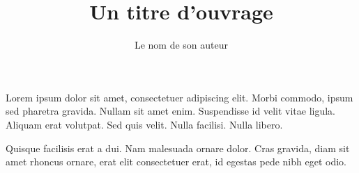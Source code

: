 \documentclass[12pt]{book}
\begin{document}
\title{Un titre d'ouvrage}
\author{Le nom de son auteur}
\date{}
\maketitle

Lorem ipsum dolor sit amet, consectetuer adipiscing elit.
Morbi commodo, ipsum sed pharetra gravida.
Nullam sit amet enim. Suspendisse id velit vitae ligula.
Aliquam erat volutpat.
Sed quis velit. Nulla facilisi. Nulla libero. 

Quisque facilisis erat a dui.
Nam malesuada ornare dolor.
Cras gravida, diam sit amet rhoncus ornare, 
erat      elit consectetuer erat, id egestas pede nibh eget odio.
\end{document}
